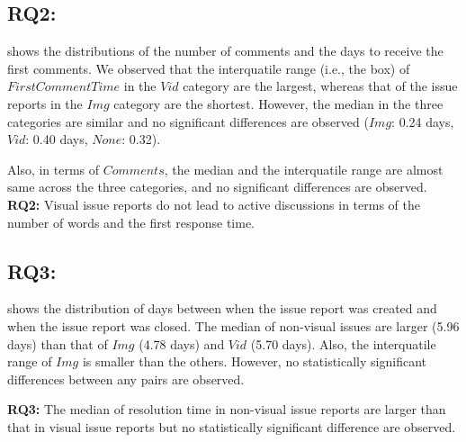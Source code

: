 \subsection*{RQ2: \RQtwo{}}


 shows the distributions of the number of comments and the days to receive the first comments. 
We observed that the interquatile range (i.e., the box) of $FirstCommentTime$ in the $Vid$ category are the largest, whereas that of the issue reports in the $Img$ category are the shortest. 
However, the median in the three categories are similar and no significant differences are observed ($Img$: 0.24 days, $Vid$: 0.40 days, $None$: 0.32). 

Also, in terms of $Comments$, the median and the interquatile range are almost same across the three categories, and no significant differences are observed. 
\summarybox
{{\bf RQ2: }{
    Visual issue reports do not lead to active discussions in terms of the number of words and the first response time. 
}}
\subsection*{RQ3: \RQthree{}}
 shows the distribution of days between when the issue report was created and when the issue report was closed. The median of non-visual issues are larger (5.96 days) than that of $Img$ (4.78 days) and $Vid$ (5.70 days). Also, the interquatile range of $Img$ is smaller than the others. However, no statistically significant differences between any pairs are observed.  

\summarybox
{{\bf RQ3: }{
The median of resolution time in non-visual issue reports are larger than that in visual issue reports but no statistically significant difference are observed. 
}}




